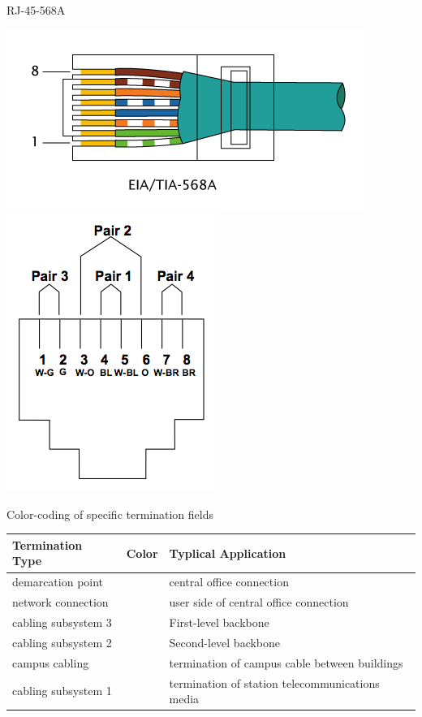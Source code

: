 \documentclass[landscape,fontscale=1,margin=0.2cm,paperwidth=70truecm, paperheight=40truecm,debug]{baposter}
\begin{document}
\begin{poster}
\begin{posterbox}[column=2,below=auto,textborder=rounded]{RJ-45-568A}
\begin{center}
\includegraphics{RJ-45_TIA-568A_Left.png}\includegraphics[scale=0.2]{pinpair.png}
\end{center}
\end{posterbox}
\begin{posterbox}[column=2,below=auto,textborder=rounded]{Color-coding of specific termination fields}
\begin{center}
\begin{tabular}{lll}
Termination Type & Color & Typlical Application\\\hline
demarcation point & \color{orange}{orange} & central office connection\\
network connection & \color{green}{green}& user side of central office connection\\
cabling subsystem 3 & \colorbox{darkgray}{\color{white}{white}}& First-level backbone\\
cabling subsystem 2 & \color{gray}{gray} & Second-level backbone\\
campus cabling & \color{brown}{brown} & termination of campus cable between buildings\\
cabling subsystem 1 & \color{blue}{blue} & termination of station telecommunications media\\

\end{tabular}
\end{center}
\end{posterbox}
\end{poster}
\end{document}
